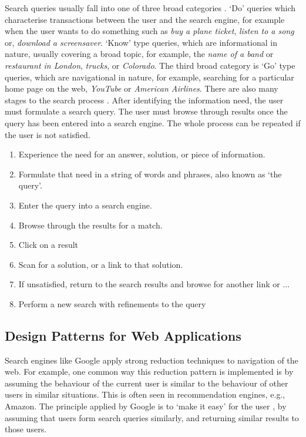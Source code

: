\documentclass[a4paper, 11pt]{article}
\begin{document}
Search queries usually fall into one of three broad categories \cite{seo}.  `Do' queries which characterise transactions between the user and the search engine, for example when the user wants to do something such as \textit{buy a plane ticket}, \textit{listen to a song} or, \textit{download a screensaver}. `Know' type queries, which are informational in nature, usually covering a broad topic, for example, the \textit{name of a band} or \textit{restaurant in London}, \textit{trucks}, or \textit{Colorado}. The third broad category is `Go' type queries, which are navigational in nature, for example, searching for a particular home page on the web, \textit{YouTube} or \textit{American Airlines}. There are also many stages to the search process \cite{seo}. After identifying the information need, the user must formulate a search query. The user must browse through results once the query has been entered into a search engine. The whole process can be repeated if the user is not satisfied. 

\begin{enumerate}
\item{Experience the need for an answer,
solution, or piece of information.}
\item{Formulate that need in a string of words and phrases, also known as `the query'.}
\item{Enter the query into a search engine.}
\item{Browse through the results for a match.}
\item{Click on a result}
\item{Scan for a solution, or a link to that solution.}
\item{If unsatisfied, return to the search results and browse for another link or ...}
\item{Perform a new search with refinements to the query}
\label{search flows}
\end {enumerate}


\subsection{Design Patterns for Web Applications}

Search engines like Google apply strong reduction techniques to navigation of the web. For example, one common way this reduction pattern is implemented is by assuming the behaviour of the current user is similar to the behaviour of other users in similar situations. This is often seen in recommendation engines, e.g., Amazon. The principle applied by Google is to `make it easy' for the user \cite{googleTerms}, by assuming that users form search queries similarly, and returning similar results to those users.
\end{document}
